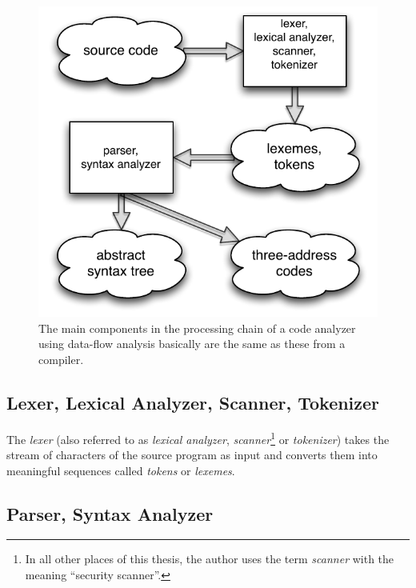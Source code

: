 \begin{figure}[htb]
  \begin{center}
    \includegraphics[scale=1.0]{images/compiler-parts}
    \caption{The main components in the processing chain of a code analyzer using data-flow analysis basically are the same as these from a compiler.}
    \label{fig:compiler-parts}
  \end{center}
\end{figure}


\subsection{Lexer, Lexical Analyzer, Scanner, Tokenizer}

The \emph{lexer} (also referred to as \emph{lexical analyzer}, \emph{scanner}\footnote{In all other places of this thesis, the author uses the term \emph{scanner} with the meaning ``security scanner''.} or \emph{tokenizer}) takes the stream of characters of the source program as input and converts them into meaningful sequences called \emph{tokens} or \emph{lexemes}.~\cite{compilers, compiler-construction}


\subsection{Parser, Syntax Analyzer}

